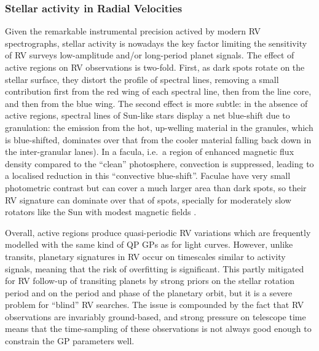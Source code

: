 \documentclass[letterpaper]{ar-1col}
\newcommand{\suz}[1]{\textcolor{magenta}{#1}}
\begin{document}
\subsubsection{Stellar activity in Radial Velocities}
Given the remarkable instrumental precision actived by modern RV spectrographs, stellar activity is nowadays the key factor limiting the sensitivity of RV surveys low-amplitude and/or long-period planet signals. The effect of active regions on RV observations is two-fold. First, as dark spots rotate on the stellar surface, they distort the profile of spectral lines, removing a small contribution first from the red wing of each spectral line, then from the line core, and then from the blue wing. The second effect is more subtle: in the absence of active regions, spectral lines of Sun-like stars display a net blue-shift due to granulation: the emission from the hot, up-welling material in the granules, which is blue-shifted, dominates over that from the cooler material falling back down in the inter-granular lanes). In a facula, i.e.\ a region of enhanced magnetic flux density compared to the ``clean'' photosphere, convection is suppressed, leading to a localised reduction in this ``convective blue-shift''. Faculae have very small photometric contrast but can cover a much larger area than dark spots, so their RV signature can dominate over that of spots, specially for moderately slow rotators like the Sun with modest magnetic fields \citep{2010A&A...512A..39M}.


Overall, active regions produce quasi-periodic RV variations which are frequently modelled with the same kind of QP GPs as for light curves. However, unlike transits, planetary signatures in RV occur on timescales similar to activity signals, meaning that the risk of overfitting is significant. This partly mitigated for RV follow-up of transiting planets by strong priors on the stellar rotation period and on the period and phase of the planetary orbit, but it is a severe problem for ``blind'' RV searches. The issue is compounded by the fact that RV observations are invariably ground-based, and strong pressure on telescope time means that the time-sampling of these observations is not always good enough to constrain the GP parameters well.
\end{document}
